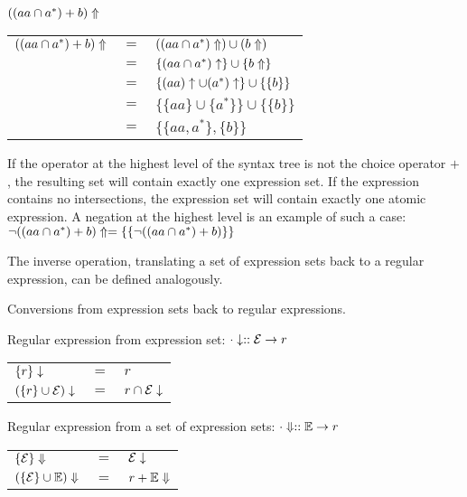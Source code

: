 \begin{eg}
   $((aa \cap a^*) + b)\Uparrow$

   \begin{tabular}{lll}
      $((aa \cap a^*) + b)\Uparrow$
      & $=$	& $((aa \cap a^*)\Uparrow) \cup (b\Uparrow)$		\\
      & $=$	& $\{(aa \cap a^*)\uparrow\} \cup \{b\Uparrow\}$		\\
      & $=$	& $\{(aa)\uparrow \cup (a^*)\uparrow\} \cup \{\{b\}\}$	\\
      & $=$	& $\{\{aa\} \cup \{a^*\}\} \cup \{\{b\}\}$			\\
      & $=$	& $\{\{aa, a^*\}, \{b\}\}$					\\
   \end{tabular}
\end{eg}

If the operator at the highest level of the syntax tree is not the choice
operator $+$, the resulting set will contain exactly one expression set. If the
expression contains no intersections, the expression set will contain exactly
one atomic expression. A negation at the highest level is an example of such a
case: $\neg((aa \cap a^*) + b)\Uparrow = \{\{\neg((aa \cap a^*) + b)\}\}$

The inverse operation, translating a set of expression sets back to a regular
expression, can be defined analogously.

\begin{defn}
   \label{defn-esets2re}
   Conversions from expression sets back to regular expressions.

   Regular expression from expression set: $\cdot\downarrow :: \mathcal{E} \to r$

   \begin{tabular}{lll}
      $\{r\}\downarrow$			& $=$	& $r$				\\
      $(\{r\} \cup \mathcal{E})\downarrow$	& $=$	& $r \cap \mathcal{E}\downarrow$	\\
   \end{tabular}

   Regular expression from a set of expression sets: $\cdot\Downarrow :: \mathbb{E} \to r$

   \begin{tabular}{lll}
      $\{\mathcal{E}\}\Downarrow$		& $=$	& $\mathcal{E}\downarrow$		\\
      $(\{\mathcal{E}\} \cup \mathbb{E})\Downarrow$	& $=$	& $r + \mathbb{E}\Downarrow$	\\
   \end{tabular}
\end{defn}

